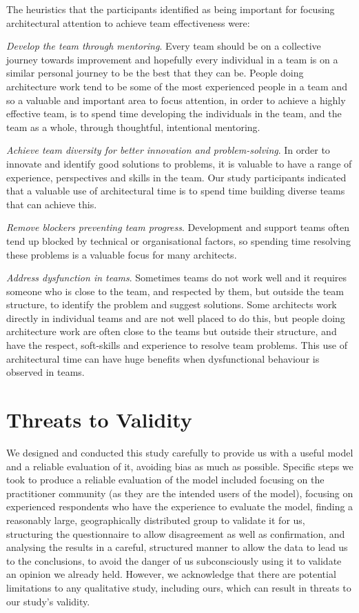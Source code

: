 The heuristics that the participants identified as being important for focusing architectural attention to achieve team effectiveness were:
\begin{description}
	\item \emph{Develop the team through mentoring}.  Every team should be on a collective journey towards improvement and hopefully every individual in a team is on a similar personal journey to be the best that they can be.  People doing architecture work tend to be some of the most experienced people in a team and so a valuable and important area to focus attention, in order to achieve a highly effective team, is to spend time developing the individuals in the team, and the team as a whole, through thoughtful, intentional mentoring.
	\item \emph{Achieve team diversity for better innovation and problem-solving}.  In order to innovate and identify good solutions to problems, it is valuable to have a range of experience, perspectives and skills in the team.  Our study participants indicated that a valuable use of architectural time is to spend time building diverse teams that can achieve this.
	\item \emph{Remove blockers preventing team progress}.  Development and support teams often tend up blocked by technical or organisational factors, so spending time resolving these problems is a valuable focus for many architects.
	\item \emph{Address dysfunction in teams}.  Sometimes teams do not work well and it requires someone who is close to the team, and respected by them, but outside the team structure, to identify the problem and suggest solutions.  Some architects work directly in individual teams and are not well placed to do this, but people doing architecture work are often close to the teams but outside their structure, and have the respect, soft-skills and experience to resolve team problems.  This use of architectural time can have huge benefits when dysfunctional behaviour is observed in teams.
\end{description}

\section{Threats to Validity}
\label{sec:threats}

We designed and conducted this study carefully to provide us with a useful model and a reliable evaluation of it, avoiding bias as much as possible.  Specific steps we took to produce a reliable evaluation of the model included focusing on the practitioner community (as they are the intended users of the model), focusing on experienced respondents who have the experience to evaluate the model, finding a reasonably large, geographically distributed group to validate it for us, structuring the questionnaire to allow disagreement as well as confirmation, and analysing the results in a careful, structured manner to allow the data to lead us to the conclusions, to avoid the danger of us subconsciously using it to validate an opinion we already held.  However, we acknowledge that there are potential limitations to any qualitative study, including ours, which can result in threats to our study's validity.

